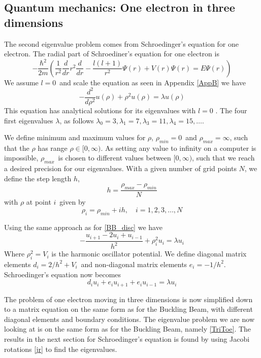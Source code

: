 \documentclass[%
reprint,
nofootinbib,
amsmath,amssymb,
aps,
]{revtex4-1}
\begin{document}
\subsection{Quantum mechanics: One electron in three dimensions} %
The second eigenvalue problem comes from Schroedinger's equation for one electron. The radial part of Schroediner's equation for one electron is 
\begin{equation}
	-\frac{\hbar^2}{2m}\left(\frac{1}{r^2}\frac{d}{dr}r^2\frac{d}{dr}- \frac{l(l+1)}{r^2}\Psi(r) + V(r)\Psi(r) = E\Psi(r)\right)
\end{equation}
We assume $l=0$ and scale the equation as seen in Appendix \ref{AppB} we have 
\begin{equation}\label{Scaled schro implem}
	-\frac{d^2}{d\rho^2}u(\rho) +\rho^2u(\rho) = \lambda u(\rho)
\end{equation}
This equation has analytical solutions for its eigenvalues with $l= 0$ \cite{Project2}. The four first eigenvalues $\lambda$, as follows $\lambda_0 = 3, \lambda_1 = 7, \lambda_3 = 11, \lambda_4 = 15, \dots$. 

We define minimum and maximum values for $\rho$, $\rho_{min} = 0$ and $\rho_{max} = \infty$, such that the $\rho$ has range $\rho\in [0,\infty)$. As setting any value to infinity on a computer is impossible, $\rho_{max}$ is chosen to different values between $[0,\infty)$, such that we reach a desired precision for our eigenvalues. With a given number of grid points $N$, we define the step length $h$, 
\begin{equation}
	h = \frac{\rho_{max} - \rho_{min}}{N}
\end{equation} 
with $\rho$ at point $i$ given by 
\begin{equation}
	\rho_i = \rho_{min}+ih, \quad i = 1,2,3,\dots,N
\end{equation}

Using the same approach as for \ref{BB_disc} we have 
\begin{equation}
		-\frac{u_{i+1} - 2u_i + u_{i-1}}{h^2} + \rho_i^2u_i= \lambda u_i
\end{equation}
Where $\rho_i^2 = V_i$ is the harmonic oscillator potential. 
We define diagonal matrix elements $d_i = 2/h^2 + V_i$ and non-diagonal matrix elements $e_i = -1/h^2$. 
Schroedinger's equation now becomes 
\begin{equation}
	d_iu_i + e_iu_{i+1} + e_iu_{i-1} = \lambda u_i
\end{equation}

The problem of one electron moving in three dimensions is now simplified down to a matrix equation on the same form as for the Buckling Beam, with different diagonal elements and boundary conditions. The eigenvalue problem we are now looking at is on the same form as for the Buckling Beam, namely \ref{TriToe}. The results in the next section for Schroedinger's equation is found by using Jacobi rotations \ref{jr} to find the eigenvalues. 
\end{document}
